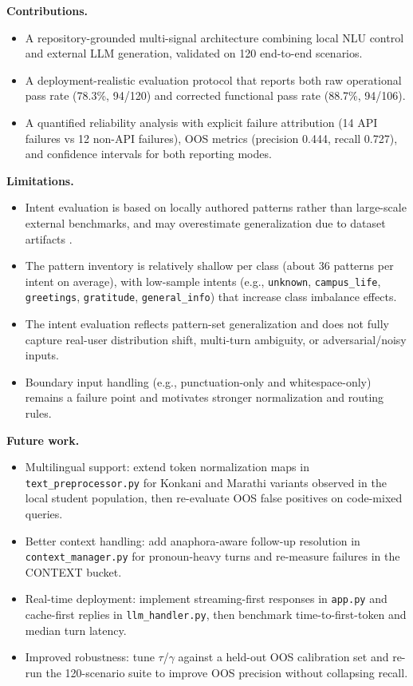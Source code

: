 \documentclass[12pt,onecolumn]{report}
\begin{document}
\textbf{Contributions.}
\begin{itemize}
\item A repository-grounded multi-signal architecture combining local NLU control and external LLM generation, validated on 120 end-to-end scenarios.
\item A deployment-realistic evaluation protocol that reports both raw operational pass rate (78.3\%, 94/120) and corrected functional pass rate (88.7\%, 94/106).
\item A quantified reliability analysis with explicit failure attribution (14 API failures vs 12 non-API failures), OOS metrics (precision 0.444, recall 0.727), and confidence intervals for both reporting modes.
\end{itemize}

\textbf{Limitations.}
\begin{itemize}
	\item Intent evaluation is based on locally authored patterns rather than large-scale external benchmarks, and may overestimate generalization due to dataset artifacts \cite{gururangan2018annotation,geva2019shortcut}.
\item The pattern inventory is relatively shallow per class (about 36 patterns per intent on average), with low-sample intents (e.g., \texttt{unknown}, \texttt{campus\_life}, \texttt{greetings}, \texttt{gratitude}, \texttt{general\_info}) that increase class imbalance effects.
	\item The intent evaluation reflects pattern-set generalization and does not fully capture real-user distribution shift, multi-turn ambiguity, or adversarial/noisy inputs.
	\item Boundary input handling (e.g., punctuation-only and whitespace-only) remains a failure point and motivates stronger normalization and routing rules.
\end{itemize}

\textbf{Future work.}
\begin{itemize}
\item Multilingual support: extend token normalization maps in \texttt{text\_preprocessor.py} for Konkani and Marathi variants observed in the local student population, then re-evaluate OOS false positives on code-mixed queries.
\item Better context handling: add anaphora-aware follow-up resolution in \texttt{context\_manager.py} for pronoun-heavy turns and re-measure failures in the CONTEXT bucket.
\item Real-time deployment: implement streaming-first responses in \texttt{app.py} and cache-first replies in \texttt{llm\_handler.py}, then benchmark time-to-first-token and median turn latency.
\item Improved robustness: tune $\tau$/$\gamma$ against a held-out OOS calibration set and re-run the 120-scenario suite to improve OOS precision without collapsing recall.
\end{itemize}
\end{document}
